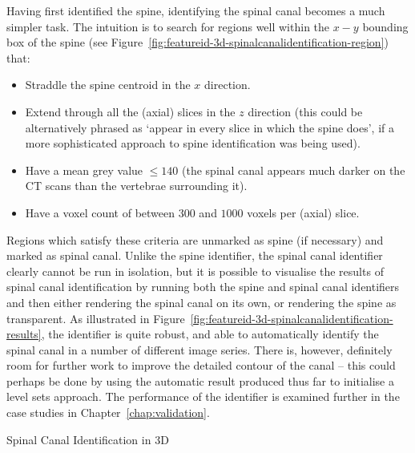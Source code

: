 \noindent Having first identified the spine, identifying the spinal canal becomes a much simpler task. The intuition is to search for regions well within the $x-y$ bounding box of the spine (see Figure~\ref{fig:featureid-3d-spinalcanalidentification-region}) that:
%
\begin{itemize}

\item Straddle the spine centroid in the $x$ direction.
\item Extend through all the (axial) slices in the $z$ direction (this could be alternatively phrased as `appear in every slice in which the spine does', if a more sophisticated approach to spine identification was being used).
\item Have a mean grey value $\le 140$ (the spinal canal appears much darker on the CT scans than the vertebrae surrounding it).
\item Have a voxel count of between $300$ and $1000$ voxels per (axial) slice.

\end{itemize}
%
Regions which satisfy these criteria are unmarked as spine (if necessary) and marked as spinal canal. Unlike the spine identifier, the spinal canal identifier clearly cannot be run in isolation, but it is possible to visualise the results of spinal canal identification by running both the spine and spinal canal identifiers and then either rendering the spinal canal on its own, or rendering the spine as transparent. As illustrated in Figure~\ref{fig:featureid-3d-spinalcanalidentification-results}, the identifier is quite robust, and able to automatically identify the spinal canal in a number of different image series. There is, however, definitely room for further work to improve the detailed contour of the canal -- this could perhaps be done by using the automatic result produced thus far to initialise a level sets approach. The performance of the identifier is examined further in the case studies in Chapter~\ref{chap:validation}.

\begin{stulisting}[!b]
\caption{Spinal Canal Identification in 3D}
\label{code:featureid-3d-spinalcanalidentification}

\end{stulisting}

